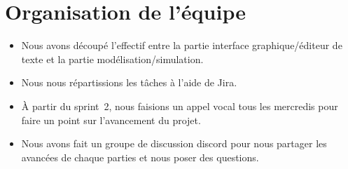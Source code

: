 \documentclass[11pt,a4paper]{article}
\begin{document}
\section*{Organisation de l'équipe}
\begin{itemize}
  \item Nous avons découpé l'effectif entre la partie interface graphique/éditeur de texte et la partie modélisation/simulation.
  \item Nous nous répartissions les tâches à l'aide de Jira.
  \item À partir du sprint~2, nous faisions un appel vocal tous les mercredis pour faire un point sur l'avancement du projet.
  \item Nous avons fait un groupe de discussion discord pour nous partager les avancées de chaque parties et nous poser des questions.
\end{itemize}
\end{document}
